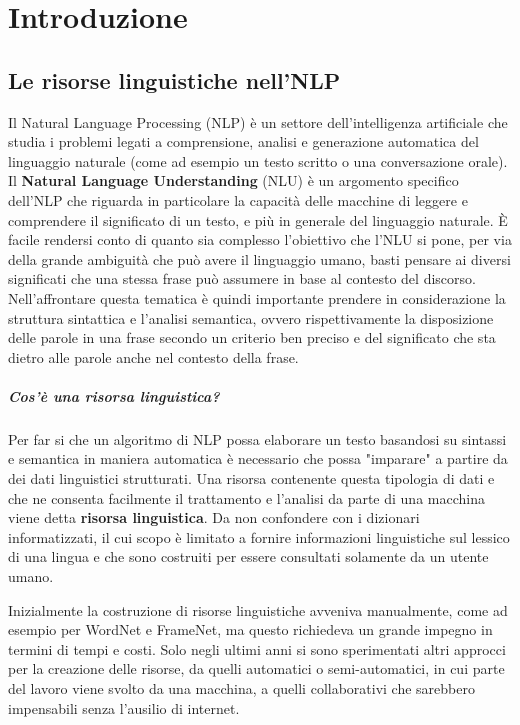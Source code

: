 
\chapter{Introduzione}


\section{Le risorse linguistiche nell'NLP}
Il Natural Language Processing (NLP) è un settore dell'intelligenza artificiale
che studia i problemi legati a comprensione, analisi e generazione automatica del
linguaggio naturale (come ad esempio un testo scritto o una conversazione orale).
Il \textbf{Natural Language Understanding} (NLU) \cite{navigli2018natural} è un argomento
specifico dell'NLP che riguarda in particolare la capacità delle macchine di leggere
e comprendere il significato di un testo, e più in generale del linguaggio naturale.
È facile rendersi conto di quanto sia complesso l'obiettivo che l'NLU si pone,
per via della grande ambiguità che può avere il linguaggio umano, basti pensare
ai diversi significati che una stessa frase può assumere in base al contesto del
discorso.
Nell'affrontare questa tematica è quindi importante prendere in considerazione
la struttura sintattica e l'analisi semantica, ovvero rispettivamente la
disposizione delle parole in una frase secondo un criterio ben preciso e del
significato che sta dietro alle parole anche nel contesto della frase.

\paragraph{Cos'è una risorsa linguistica?}
Per far si che un algoritmo di NLP possa elaborare un testo basandosi su sintassi
e semantica in maniera automatica è necessario che possa "imparare" a partire
da dei dati linguistici strutturati.
Una risorsa contenente questa tipologia di dati e che ne consenta facilmente il
trattamento e l'analisi da parte di una macchina viene detta \textbf{risorsa linguistica}.
Da non confondere con i dizionari informatizzati, il cui scopo è limitato a
fornire informazioni linguistiche sul lessico di una lingua e che sono costruiti
per essere consultati solamente da un utente umano.

Inizialmente la costruzione di risorse linguistiche avveniva manualmente, come
ad esempio per WordNet e FrameNet, ma questo richiedeva un grande impegno in
termini di tempi e costi.
Solo negli ultimi anni si sono sperimentati altri approcci per la creazione
delle risorse, da quelli automatici o semi-automatici, in cui parte del lavoro
viene svolto da una macchina, a quelli collaborativi che sarebbero impensabili
senza l'ausilio di internet.

